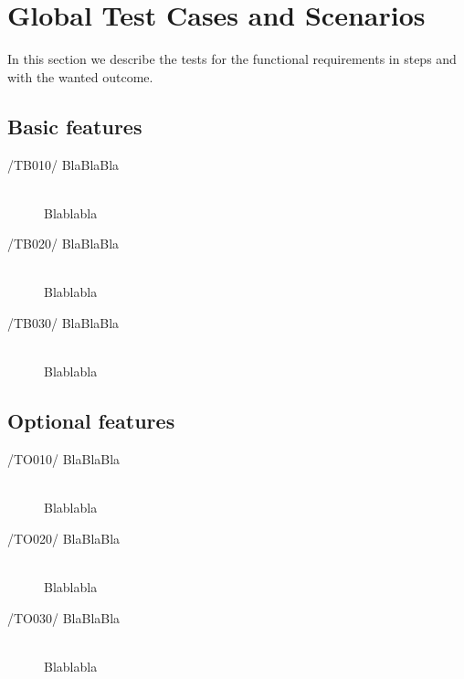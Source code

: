\section{Global Test Cases and Scenarios}

In this section we describe the tests for the functional requirements in steps and with the wanted outcome. 

\subsection{Basic features}
\begin{description}
\item[/TB010/ BlaBlaBla]\hfill \\ Blablabla
\item[/TB020/ BlaBlaBla]\hfill \\ Blablabla
\item[/TB030/ BlaBlaBla]\hfill \\ Blablabla
\end{description}

\subsection{Optional features}
\begin{description}
\item[/TO010/ BlaBlaBla]\hfill \\ Blablabla
\item[/TO020/ BlaBlaBla]\hfill \\ Blablabla
\item[/TO030/ BlaBlaBla]\hfill \\ Blablabla
\end{description}